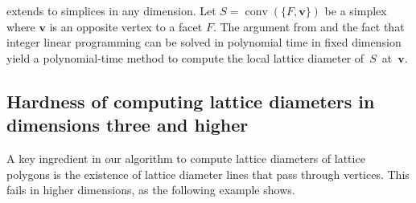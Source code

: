 \documentclass[11pt]{article}
\newcommand{\bv}{\mathbf{v}}
\DeclareMathOperator{\conv}{conv}
\begin{document}
\begin{remark}
    extends to simplices in any dimension. Let $S = \conv(\{F, \bv\})$ be a simplex where $\bv$ is an opposite vertex to a facet $F$. The argument from \mbox{} and the fact that integer linear programming can be solved in polynomial time in fixed dimension~\cite{ILP_poly} yield a polynomial-time method to compute the local lattice diameter \mbox{of $S$ at $\bv$}.
\end{remark}







\subsection{Hardness of computing lattice diameters in dimensions three and higher}\label{sec:NP-hard}

A key ingredient in our algorithm to compute lattice diameters of lattice polygons is the existence of lattice diameter lines that pass through vertices. This fails in higher dimensions, as the following example shows.
\end{document}
